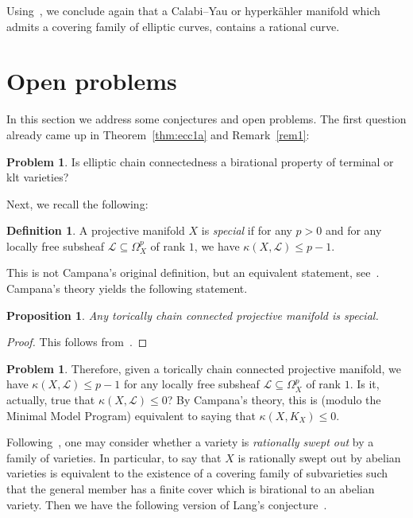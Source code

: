 \documentclass[11pt]{article}
\newtheorem{prop}[theo]{Proposition}
\theoremstyle{definition}
\newtheorem{defi}[theo]{Definition}
\numberwithin{equation}{section}
\numberwithin{figure}{section}
\numberwithin{table}{section}
\newtheorem{problem}[theo]{Problem}}
\newcommand\sL{\mathcal{L}}
\newcommand*{\MK}{\mkern 2mu}
\begin{document}
Using~\cite{DFM16}, we conclude again that a Calabi--Yau or hyperkähler manifold which admits a covering family of elliptic curves, contains a rational curve.

\section{Open problems}\label{Sect.7}
In this section we address some conjectures and open problems. The first question already came up in Theorem~\ref{thm:ecc1a} and Remark~\ref{rem1}:

\begin{problem}\label{prob:main7.1}
Is elliptic chain connectedness a birational property of terminal or klt varieties?
\end{problem}

Next, we recall the following:

\begin{defi}\label{def:main7.2}
A projective manifold $X$ is \emph{special} if for any $p>0$ and for any locally free subsheaf $\sL \subseteq \Omega^p_X$ of rank $1$, we have $\kappa (X,\sL) \leq p-1$.
\end{defi}

This is not Campana's original definition, but an equivalent statement, see~\cite[Theorem~2.27]{Ca04a}. Campana's theory yields the following statement.

\begin{prop}\label{prop:main7.3}
Any torically chain connected projective manifold is special.
\end{prop}

\begin{proof}
This follows from~\cite[Theorem~3.3$\MK$(2) and Theorem~5.1]{Ca04a}.
\end{proof}

\begin{problem}\label{prob:main7.4}
Therefore, given a torically chain connected projective manifold, we have $\kappa (X, \sL) \leq p-1$ for any locally free subsheaf $\sL \subseteq \Omega^p_X $ of rank $1$. Is it, actually, true that $\kappa (X, \sL) \leq 0$? By Campana's theory, this is (modulo the Minimal Model Program) equivalent to saying that $\kappa (X,K_X) \leq 0$.
\end{problem}

Following~\cite[Definition~3.26]{Voi03}, one may consider whether a variety is \emph{rationally swept out} by a family of varieties. In particular, to say that $X$ is rationally swept out by abelian varieties is equivalent to the existence of a covering family of subvarieties such that the general member has a finite cover which is birational to an abelian variety. Then we have the following version of Lang's conjecture~\cite[Conjecture~3.31]{Voi03}.
\end{document}
